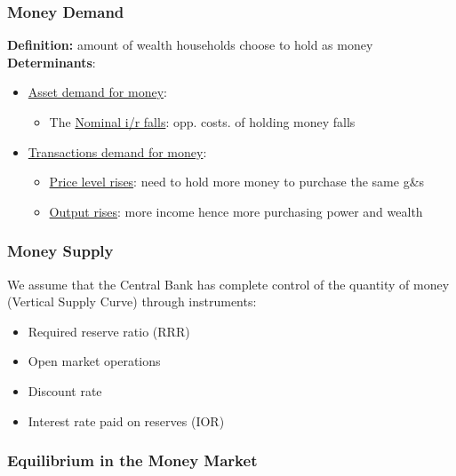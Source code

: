 \documentclass{article}
\begin{document}
\begin{multicols}{2}
\subsubsection{Money Demand}
\textbf{Definition:} amount of wealth households choose to hold as money\\
\textbf{Determinants}:
\begin{itemize}
	\item \underline{Asset demand for money}:
	\begin{itemize}
		\item The \underline{Nominal i/r falls}: opp. costs. of holding money falls
	\end{itemize}
	\item \underline{Transactions demand for money}:
	\begin{itemize}
		\item \underline{Price level rises}: need to hold more money to purchase the same g\&s
		\item \underline{Output rises}: more income hence more purchasing power and wealth
	\end{itemize}
\end{itemize}

\subsubsection{Money Supply}
We assume that the Central Bank has complete control of the quantity of money (Vertical Supply Curve) through instruments:
\begin{itemize}
	\item Required reserve ratio (RRR)
	\item Open market operations
	\item Discount rate
	\item Interest rate paid on reserves (IOR)
\end{itemize}
\subsubsection{Equilibrium in the Money Market}


\end{multicols}
\end{document}
